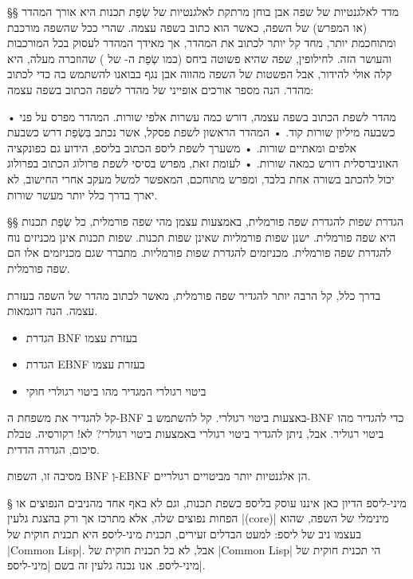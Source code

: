 \begin{editing}
§§ מדד לאלגנטיות של שפה
אבן בוחן מרתקת לאלגנטיות של שְׂפַת תכנות היא אורך המהדר (או המפרש) של השפה, כאשר
הוא כתוב בשפה עצמה. שהרי ככל שהשפה מורכבת ומתוחכמת יותר, מחד קל יותר לכתוב את
המהדר, אך מאידך המהדר לעסוק בכל המורכבות והעושר הזה. לחילופין, שפה שהיא פשוטה
ביחס (כמו שְׂפַת ה- של ) שהוזכרה מעלה, היא קלה אולי להידור, אבל
הפשטות של השפה מהווה אבן נגף בבואנו להשתמש בה כדי לכתוב מהדר.
הנה מספר אורכים אופייני של מהדר לשפה הכתוב בשפה עצמה:
\begin{enumerate}
  • מהדר לשפת  הכתוב בשפה עצמה, דורש כמה עשרות אלפי שורות. המהדר  מפרס
  על פני כשבעה מיליון שורות קוד.
  • המהדר הראשון לשפת פסקל, אשר נכתב בִּשְׂפַת  דרש כשבעת אלפים ומאתיים שורות.
  • משערך לשפת ליספ הכתוב בליספ, הידוע גם כפונקציה האוניברסלית  דורש
  כמאה שורות.
  • לעומת זאת, מפרש בסיסי לשפת פרולוג הכתוב בפרולוג יכול להכתב בשורה אחת בלבד,
  ומפרש מתוחכם, המאפשר למשל מעקב אחרי החישוב, לא יארך בדרך כלל יותר מעשר שורות.
\end{enumerate}

§§ הגדרת שפות להגדרת שפה פורמלית, באמצעות עצמן
מהי שפה פורמלית, כל שְׂפַת תכנות היא שפה פורמלית. ישנן שפות פורמליות שאינן שפות
תכנות.  שפות תכנות אינן מכניזים נוח להגדרת שפה פורמלית.  מכניזמים להגדרת שפות
פורמליות. מתברר שגם מכניזמים אלו הם שפה פורמלית.

בדרך כלל, קל הרבה יותר להגדיר שפה פורמלית, מאשר לכתוב מהדר של השפה בעזרת עצמה.
הנה דוגמאות.
\begin{itemize}

  \item הגדרת BNF בעזרת עצמו

  \item הגדרת EBNF בעזרת עצמו

  \item ביטוי רגולרי המגדיר מהו ביטוי רגולרי חוקי
\end{itemize}
קל להגדיר את משפחת ה-BNF באצעות ביטוי רגולרי.
קל להשתמש ב-BNF כדי להגדיר מהו ביטוי רגוליר.
אבל, ניתן להגדיר ביטוי רגולרי באמצעות ביטוי רגולרי? לא! רקורסיה.
טבלת סיכום, הגדרה הדדית.

מסיבה זו, השפות BNF וְ-EBNF הן אלגנטיות יותר מביטויים רגולריים.

\end{editing} 
§ מיני-ליספ
הדיון כאן איננו עוסק בליספ כשפת תכנות, וגם לא באף אחד מהניבים הנפוצים או הפחות
נפוצים שלה, אלא מתרכז אך ורק בהצגת גלעין \E|(core)| מינימלי של השפה, שהוא בעצמו
ניב של ליספ: למעט הבדלים זעירים, תכנית מיני-ליספ היא תכנית חוקית של \E|Common Lisp|.
אבל, לא כל תכנית חוקית של \E|Common Lisp| הי תכנית חוקית של מיני-ליספ. אנו נכנה גלעין זה
בשם \ע|מיני-ליספ|.  

